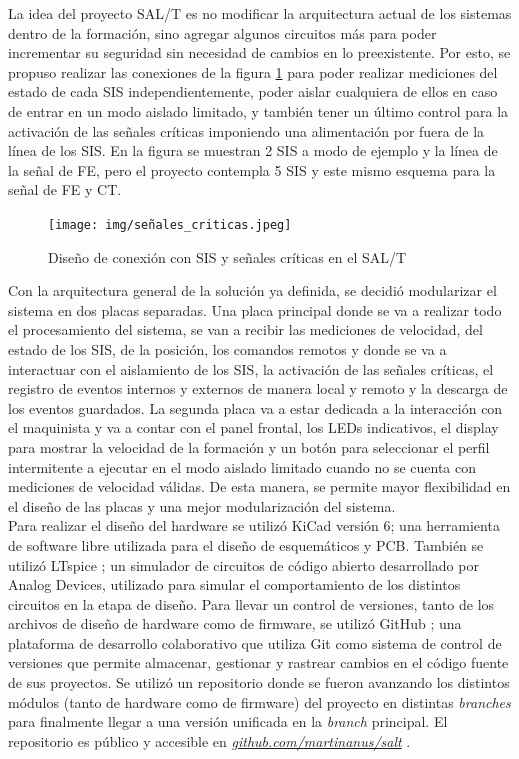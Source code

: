 La idea del proyecto SAL/T es no modificar la arquitectura actual de los sistemas dentro de la formación, sino agregar algunos circuitos más para poder incrementar su seguridad sin necesidad de cambios en lo preexistente. Por esto, se propuso realizar las conexiones de la figura \ref{fig:señales_criticas} para poder realizar mediciones del estado de cada SIS independientemente, poder aislar cualquiera de ellos en caso de entrar en un modo aislado limitado, y también tener un último control para la activación de las señales críticas imponiendo una alimentación por fuera de la línea de los SIS. En la figura se muestran 2 SIS a modo de ejemplo y la línea de la señal de FE, pero el proyecto contempla 5 SIS y este mismo esquema para la señal de FE y CT. 


\begin{figure}[H]
    \centering
    \texttt{[image: img/señales\_criticas.jpeg]}
    \caption{Diseño de conexión con SIS y señales críticas en el SAL/T}
    \label{fig:señales_criticas}
\end{figure}

Con la arquitectura general de la solución ya definida, se decidió modularizar el sistema en dos placas separadas. Una placa principal donde se va a realizar todo el procesamiento del sistema, se van a recibir las mediciones de velocidad, del estado de los SIS, de la posición, los comandos remotos y donde se va a interactuar con el aislamiento de los SIS, la activación de las señales críticas, el registro de eventos internos y externos de manera local y remoto y la descarga de los eventos guardados. La segunda placa va a estar dedicada a la interacción con el maquinista y va a contar con el panel frontal, los LEDs indicativos, el display para mostrar la velocidad de la formación y un botón para seleccionar el perfil intermitente a ejecutar en el modo aislado limitado cuando no se cuenta con mediciones de velocidad válidas. De esta manera, se permite mayor flexibilidad en el diseño de las placas y una mejor modularización del sistema. \\ 

Para realizar el diseño del hardware se utilizó KiCad \cite{kicad} versión 6; una herramienta de software libre utilizada para el diseño de esquemáticos y PCB. También se utilizó LTspice \cite{LTspice}; un simulador de circuitos de código abierto desarrollado por Analog Devices, utilizado para simular el comportamiento de los distintos circuitos en la etapa de diseño. Para llevar un control de versiones, tanto de los archivos de diseño de hardware como de firmware, se utilizó GitHub \cite{github}; una plataforma de desarrollo colaborativo que utiliza Git \cite{git} como sistema de control de versiones que permite almacenar, gestionar y rastrear cambios en el código fuente de sus proyectos. Se utilizó un repositorio donde se fueron avanzando los distintos módulos (tanto de hardware como de firmware) del proyecto en distintas \textit{branches} para finalmente llegar a una versión unificada en la \textit{branch} principal. El repositorio es público y accesible en \href{https://github.com/martinanus/salt}{\textit{github.com/martinanus/salt}} \cite{repo}.






